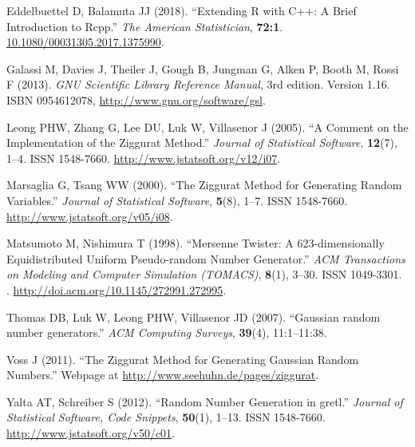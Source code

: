 \begin{thebibliography}{14}
Eddelbuettel D, Balamuta JJ (2018).
\newblock \enquote{Extending R with C++: A Brief Introduction to Rcpp.}
\newblock \emph{The American Statistician}, \textbf{72:1}.
\newblock \url{10.1080/00031305.2017.1375990}.
  
Galassi M, Davies J, Theiler J, Gough B, Jungman G, Alken P, Booth M, Rossi F
  (2013).
\newblock \emph{{GNU} {S}cientific {L}ibrary {R}eference {M}anual}, 3rd
  edition.
\newblock Version 1.16. {ISBN} 0954612078,
  \urlprefix\url{http://www.gnu.org/software/gsl}.

Leong PHW, Zhang G, Lee DU, Luk W, Villasenor J (2005).
\newblock \enquote{A Comment on the Implementation of the Ziggurat Method.}
\newblock \emph{Journal of Statistical Software}, \textbf{12}(7), 1--4.
\newblock ISSN 1548-7660.
\newblock \urlprefix\url{http://www.jstatsoft.org/v12/i07}.

Marsaglia G, Tsang WW (2000).
\newblock \enquote{The Ziggurat Method for Generating Random Variables.}
\newblock \emph{Journal of Statistical Software}, \textbf{5}(8), 1--7.
\newblock ISSN 1548-7660.
\newblock \urlprefix\url{http://www.jstatsoft.org/v05/i08}.

Matsumoto M, Nishimura T (1998).
\newblock \enquote{Mersenne Twister: A 623-dimensionally Equidistributed
  Uniform Pseudo-random Number Generator.}
\newblock \emph{ACM Transactions on Modeling and Computer Simulation (TOMACS)},
  \textbf{8}(1), 3--30.
\newblock ISSN 1049-3301.
\newblock {}.
\newblock \urlprefix\url{http://doi.acm.org/10.1145/272991.272995}.

Thomas DB, Luk W, Leong PHW, Villasenor JD (2007).
\newblock \enquote{Gaussian random number generators.}
\newblock \emph{ACM Computing Surveys}, \textbf{39}(4), 11:1--11:38.

Voss J (2011).
\newblock \enquote{The Ziggurat Method for Generating Gaussian Random Numbers.}
\newblock Webpage at \url{http://www.seehuhn.de/pages/ziggurat}.

Yalta AT, Schreiber S (2012).
\newblock \enquote{Random Number Generation in gretl.}
\newblock \emph{Journal of Statistical Software, Code Snippets},
  \textbf{50}(1), 1--13.
\newblock ISSN 1548-7660.
\newblock \urlprefix\url{http://www.jstatsoft.org/v50/c01}.

\end{thebibliography}

